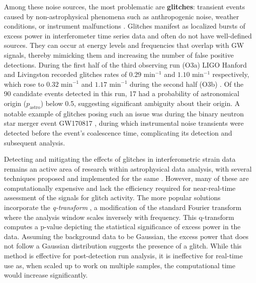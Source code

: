 \documentclass[12pt]{article}
\begin{document}
\medskip
\noindent Among these noise sources, the most problematic are \textbf{glitches}: transient events caused by non-astrophysical phenomena such as anthropogenic noise, weather conditions, or instrument malfunctions \cite{collaboration_guide_2020, collaboration_characterization_2016}. Glitches manifest as localized bursts of excess power in interferometer time series data and often do not have well-defined sources. They can occur at energy levels and frequencies that overlap with GW signals, thereby mimicking them and increasing the number of false positive detections. During the first half of the third observing run (O3a) LIGO Hanford and Livingston recorded glitches rates of $0.29\text{ min}^{-1}$ and $1.10\text{ min}^{-1}$ respectively, which rose to $0.32\text{ min}^{-1}$ and $1.17\text{ min}^{-1}$ during the second half (O3b) \cite{collaboration_gwtc-3_2023}. Of the 90 candidate events detected in this run, 17 had a probability of astronomical origin ($p_\text{astro}$) below 0.5, suggesting significant ambiguity about their origin. A notable example of glitches posing such an issue was during the binary neutron star merger event GW170817 \cite{collaboration_gw170817_2017}, during which instrumental noise transients were detected before the event's coalescence time, complicating its detection and subsequent analysis.

\medskip
\noindent Detecting and mitigating the effects of glitches in interferometric strain data remains an active area of research within astrophysical data analysis, with several techniques proposed and implemented for the same \cite{robinet_omicron_2020, MACLEOD2021100657, davis_subtracting_2022}. However, many of these are computationally expensive and lack the efficiency required for near-real-time assessment of the signals for glitch activity. The more popular solutions incorporate the \textit{q-transform} \cite{chatterji_multiresolution_2004, vazsonyi_identifying_2023}, a modification of the standard Fourier transform where the analysis window scales inversely with frequency. This q-transform computes a p-value depicting the statistical significance of excess power in the data. Assuming the background data to be Gaussian, the excess power that does not follow a Gaussian distribution suggests the presence of a glitch. While this method is effective for post-detection run analysis, it is ineffective for real-time use as, when scaled up to work on multiple samples, the computational time would increase significantly.

\end{document}
